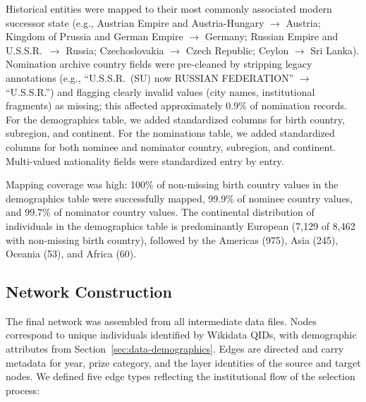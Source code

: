 \documentclass[11pt]{article}
\begin{document}
Historical entities were mapped to their most commonly associated modern successor state (e.g., Austrian Empire and Austria-Hungary $\to$ Austria; Kingdom of Prussia and German Empire $\to$ Germany; Russian Empire and U.S.S.R.\ $\to$ Russia; Czechoslovakia $\to$ Czech Republic; Ceylon $\to$ Sri Lanka). Nomination archive country fields were pre-cleaned by stripping legacy annotations (e.g., ``U.S.S.R.\ (SU) now RUSSIAN FEDERATION'' $\to$ ``U.S.S.R.'') and flagging clearly invalid values (city names, institutional fragments) as missing; this affected approximately 0.9\% of nomination records. For the demographics table, we added standardized columns for birth country, subregion, and continent. For the nominations table, we added standardized columns for both nominee and nominator country, subregion, and continent. Multi-valued nationality fields were standardized entry by entry.

Mapping coverage was high: 100\% of non-missing birth country values in the demographics table were successfully mapped, 99.9\% of nominee country values, and 99.7\% of nominator country values. The continental distribution of individuals in the demographics table is predominantly European (7{,}129 of 8{,}462 with non-missing birth country), followed by the Americas (975), Asia (245), Oceania (53), and Africa (60).

\subsection{Network Construction}
\label{sec:network-construction}

The final network was assembled from all intermediate data files. Nodes correspond to unique individuals identified by Wikidata QIDs, with demographic attributes from Section~\ref{sec:data-demographics}. Edges are directed and carry metadata for year, prize category, and the layer identities of the source and target nodes. We defined five edge types reflecting the institutional flow of the selection process:
\end{document}
